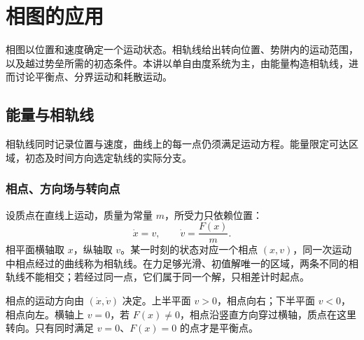 \documentclass[11pt,openany,fontset=fandol]{ctexbook}
\theoremstyle{definition}\newtheorem{example}{例}[chapter]\newtheorem{exercise}{习题}[chapter]
\begin{document}
\chapter{相图的应用}

相图以位置和速度确定一个运动状态。相轨线给出转向位置、势阱内的运动范围，以及越过势垒所需的初态条件。本讲以单自由度系统为主，由能量构造相轨线，进而讨论平衡点、分界运动和耗散运动。


\section{能量与相轨线}
相轨线同时记录位置与速度，曲线上的每一点仍须满足运动方程。能量限定可达区域，初态及时间方向选定轨线的实际分支。

\subsection{相点、方向场与转向点}
设质点在直线上运动，质量为常量 $m$，所受力只依赖位置：
\begin{equation}\label{mp4:eq:l4-autonomous}
\dot x=v,\qquad \dot v=\frac{F(x)}m.
\end{equation}
相平面横轴取 $x$，纵轴取 $v$。某一时刻的状态对应一个相点 $(x,v)$，同一次运动中相点经过的曲线称为相轨线。在力足够光滑、初值解唯一的区域，两条不同的相轨线不能相交；若经过同一点，它们属于同一个解，只相差计时起点。

相点的运动方向由 $(\dot x,\dot v)$ 决定。上半平面 $v>0$，相点向右；下半平面 $v<0$，相点向左。横轴上 $v=0$，若 $F(x)\ne0$，相点沿竖直方向穿过横轴，质点在这里转向。只有同时满足 $v=0$、$F(x)=0$ 的点才是平衡点。
\end{document}
